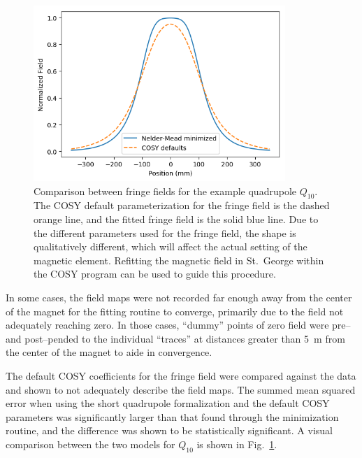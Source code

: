 \begin{figure}[h]
    \begin{center}
        \centerline{
            \includegraphics[width=0.85\textwidth]{figures/enge_comparison.png}}
        \caption[Comparison between fringe fields]{Comparison between
            fringe fields for the example quadrupole $Q_{10}$. The COSY
            default parameterization for the fringe field is the dashed
            orange line, and the fitted fringe field is the solid blue
            line. Due to the different parameters used for the fringe
            field, the shape is qualitatively different, which will
            affect the actual setting of the magnetic element. Refitting
            the magnetic field in St.\ George within the COSY program
            can be used to guide this procedure.}
        \label{fig:enge_comparison}
    \end{center}
\end{figure}

In some cases, the field maps were not recorded far enough away from the
center of the magnet for the fitting routine to converge, primarily due
to the field not adequately reaching zero. In those cases, ``dummy''
points of zero field were pre\---{} and post\---{}pended to the
individual ``traces'' at distances greater than 5~m from the center of
the magnet to aide in convergence.

The default COSY coefficients for the fringe field were compared against
the data and shown to not adequately describe the field maps. The summed
mean squared error when using the short quadrupole formalization and the
default COSY parameters was significantly larger than that found through
the minimization routine, and the difference was shown to be
statistically significant. A visual comparison between the two models
for $Q_{10}$ is shown in Fig.~\ref{fig:enge_comparison}.

